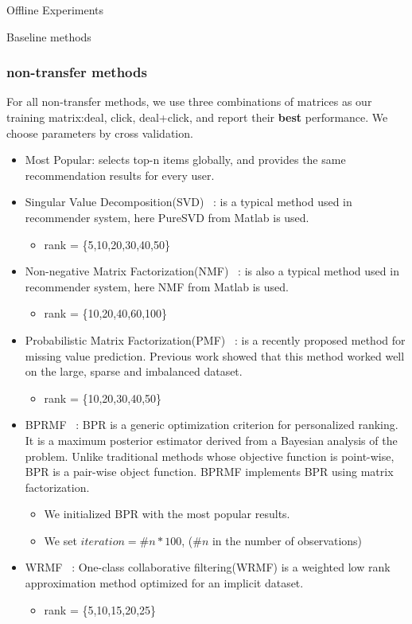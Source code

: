 \begin{section}{Offline Experiments}
\begin{subsection}{Baseline methods}
\subsubsection{non-transfer methods}
\par{
  For all non-transfer methods, we use three combinations of matrices as our training matrix:{deal, click, deal+click}, and report their \textbf{best} performance. We choose parameters by cross validation.
  \begin{itemize}
    \item Most Popular: selects top-n items globally, and provides the same recommendation results for every user.
    \item Singular Value Decomposition(SVD) ~\cite{paterek07}:  is a typical method used in recommender system, here PureSVD from Matlab is used.
      \begin{itemize}
      \item rank = \{5,10,20,30,40,50\}
      \end{itemize}
    \item Non-negative Matrix Factorization(NMF)  ~\cite{/computer/yehuda09matrix}: is also a typical method used in recommender system, here NMF from Matlab is used.
      \begin{itemize}
      \item rank = \{10,20,40,60,100\}
      \end{itemize}
    \item Probabilistic Matrix Factorization(PMF) ~\cite{/nips/SalMnih08}: is a recently proposed method for missing value prediction. Previous work showed that this method worked well on the large, sparse and imbalanced dataset.
      \begin{itemize}
      \item rank = \{10,20,30,40,50\}
      \end{itemize}
    \item BPRMF ~\cite{Rendle:2009:BBP:1795114.1795167}: BPR is a generic optimization criterion for personalized ranking. It is a maximum posterior estimator derived from a Bayesian analysis of the problem. Unlike traditional methods whose objective function is point-wise, BPR is a pair-wise object function. BPRMF implements BPR using matrix factorization.
      \begin{itemize}
      \item We initialized BPR with the most popular results.
      \item We set $iteration = \#n * 100$, ($\#n$ in the number of observations)
      \end{itemize}
    \item WRMF ~\cite{4781145}: One-class collaborative filtering(WRMF) is a weighted low rank approximation method optimized for an implicit dataset. 
      \begin{itemize}
      \item rank = \{5,10,15,20,25\}
    \end{itemize}
\end{itemize}
}
\end{subsection}
\end{section}
